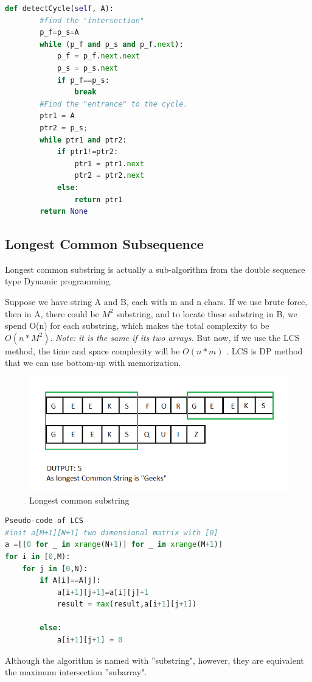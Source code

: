 \documentclass[../specific-algorithms.tex]{subfiles}
\begin{document}
\begin{lstlisting}[language = Python]
def detectCycle(self, A):
        #find the "intersection" 
        p_f=p_s=A
        while (p_f and p_s and p_f.next):
            p_f = p_f.next.next
            p_s = p_s.next
            if p_f==p_s:
                break
        #Find the "entrance" to the cycle.
        ptr1 = A
        ptr2 = p_s;
        while ptr1 and ptr2:
            if ptr1!=ptr2:
                ptr1 = ptr1.next
                ptr2 = ptr2.next
            else:
                return ptr1
        return None
\end{lstlisting}

\subsection{Longest Common Subsequence}
Longest common substring is actually a sub-algorithm from the double sequence type Dynamic programming. 

Suppose we have string A and B, each with m and n chars. If we use brute force, then in A, there could be $M^2$ substring, and to locate these substring in B, we spend O(n) for each substring, which makes the total complexity to be $O(n*M^2)$. \textit{Note: it is the same if its two arrays.} But now, if we use the LCS method, the time and space complexity will be $O(n*m)$ . LCS is DP method that we can use bottom-up with memorization.
\begin{figure}[h]
    \centering
    \includegraphics[width = 0.98\columnwidth]{fig/lcs.png}
    \caption{Longest common substring}
    \label{fig:lcs}
\end{figure}
\begin{lstlisting}[language = Python]
Pseudo-code of LCS
#init a[M+1][N+1] two dimensional matrix with [0]
a =[[0 for _ in xrange(N+1)] for _ in xrange(M+1)]
for i in [0,M):
    for j in [0,N):
        if A[i]==A[j]:
            a[i+1][j+1]=a[i][j]+1
            result = max(result,a[i+1][j+1])

        else:
            a[i+1][j+1] = 0
\end{lstlisting}
Although the algorithm is named with ''substring", however, they are equivalent the maximum intersection ''subarray".
\end{document}
